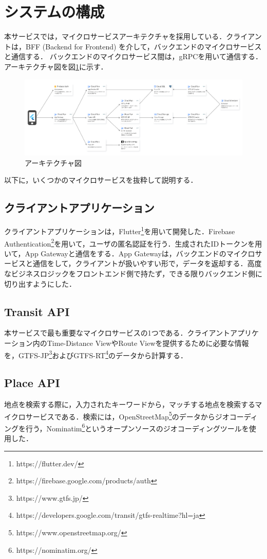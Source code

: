 \section{システムの構成}
本サービスでは，マイクロサービスアーキテクチャを採用している．クライアントは，BFF (Backend for Frontend) を介して，バックエンドのマイクロサービスと通信する．
バックエンドのマイクロサービス間は，gRPCを用いて通信する．アーキテクチャ図を図\ref{fig:architecture}に示す．
\begin{figure}[H]
    \centering
    \includegraphics[width=14cm]{images/architecture_diagram.png}
    \caption{アーキテクチャ図}
    \label{fig:architecture}
\end{figure}
以下に，いくつかのマイクロサービスを抜粋して説明する．

\subsection{クライアントアプリケーション}
クライアントアプリケーションは，Flutter\footnote{https://flutter.dev/}を用いて開発した．Firebase Authentication\footnote{https://firebase.google.com/products/auth}を用いて，ユーザの匿名認証を行う．生成されたIDトークンを用いて，App Gatewayと通信をする．App Gatewayは，バックエンドのマイクロサービスと通信をして，クライアントが扱いやすい形で，データを返却する．高度なビジネスロジックをフロントエンド側で持たず，できる限りバックエンド側に切り出すようにした．

\subsection{Transit API}
本サービスで最も重要なマイクロサービスの1つである．クライアントアプリケーション内のTime-Distance ViewやRoute Viewを提供するために必要な情報を，GTFS-JP\footnote{https://www.gtfs.jp/}およびGTFS-RT\footnote{https://developers.google.com/transit/gtfs-realtime?hl=ja}のデータから計算する．

\subsection{Place API}
地点を検索する際に，入力されたキーワードから，マッチする地点を検索するマイクロサービスである．検索には，OpenStreetMap\footnote{https://www.openstreetmap.org/}のデータからジオコーディングを行う，Nominatim\footnote{https://nominatim.org/}というオープンソースのジオコーディングツールを使用した．
